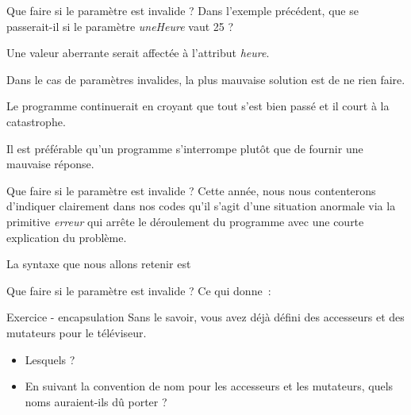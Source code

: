 \begin{frame}{Que faire si le paramètre est invalide ?}
	Dans l'exemple précédent, 
	que se passerait-il si le paramètre \textit{uneHeure} vaut 25 ? 
	
	\pause
	
	\bigskip
	
	Une valeur aberrante serait affectée à l'attribut \textit{heure}.

	\pause
	
	Dans le cas de paramètres invalides, 
	la plus mauvaise solution est de ne rien faire. 
	
	Le programme continuerait en croyant que tout s’est bien
	passé et il court à la catastrophe. 
	
	Il est préférable qu’un programme s'interrompe 
	plutôt que de fournir une mauvaise réponse. 
\end{frame}

\begin{frame}{Que faire si le paramètre est invalide ?}
	Cette année, nous nous contenterons d'indiquer
	clairement dans nos codes qu'il s'agit d'une situation anormale 
	via la primitive \textit{erreur} qui arrête le déroulement du
	programme avec une courte explication du problème.
	
	\bigskip

	La syntaxe que nous allons retenir est
	
	\bigskip

\end{frame}

\begin{frame}{Que faire si le paramètre est invalide ?}
	Ce qui donne~:	
	
\end{frame}

\begin{frame}{Exercice - encapsulation}
		Sans le savoir, vous avez déjà défini des accesseurs et des 
		mutateurs pour le téléviseur. 
		
		\begin{itemize}
			\item
			Lesquels ? 
			\item
			En suivant la convention de nom pour les accesseurs et les mutateurs, 
			quels noms auraient-ils dû porter ?
		\end{itemize}
\end{frame}

